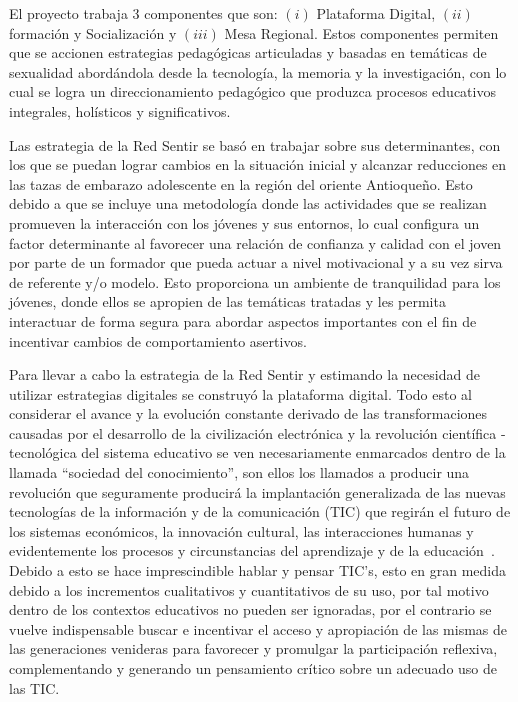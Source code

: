 \documentclass[journal,transmag]{IEEEtran}
\begin{document}
El proyecto trabaja 3 componentes que son: $(i)$ Plataforma Digital, $(ii)$ formación y Socialización y $(iii)$ Mesa Regional. Estos componentes permiten que se accionen estrategias pedagógicas articuladas y basadas en temáticas de sexualidad abordándola desde la tecnología, la memoria y la investigación, con lo cual se logra un direccionamiento pedagógico que produzca procesos educativos integrales, holísticos y significativos. 

Las estrategia de la Red Sentir se basó en trabajar sobre sus determinantes, con los que se puedan lograr cambios en la situación inicial y alcanzar reducciones en las tazas de embarazo adolescente en la región del oriente Antioqueño. Esto debido a que se incluye una metodología donde las actividades que se realizan promueven la interacción con los jóvenes y sus entornos, lo cual configura un factor determinante al favorecer una relación de confianza y calidad con el joven por parte de un formador que pueda actuar a nivel motivacional y a su vez sirva de referente y/o modelo. Esto proporciona un ambiente de tranquilidad para los jóvenes, donde ellos se apropien de las temáticas tratadas y les permita interactuar de forma segura para abordar aspectos importantes con el fin de incentivar cambios de comportamiento asertivos.

Para llevar a cabo la estrategia de la Red Sentir y estimando la necesidad de utilizar estrategias digitales se construyó la plataforma digital. Todo esto al considerar el avance y la evolución constante derivado de las transformaciones causadas por el desarrollo de la civilización electrónica y la revolución científica - tecnológica del sistema educativo se ven necesariamente enmarcados dentro de la llamada ``sociedad del conocimiento'', son ellos los llamados a producir una revolución que seguramente producirá la implantación generalizada de las nuevas tecnologías de la información y de la comunicación (TIC) que regirán el futuro de los sistemas económicos, la innovación cultural, las interacciones humanas y evidentemente los procesos y circunstancias del aprendizaje y de la educación~\cite{Asin2009}. Debido a esto se hace imprescindible hablar y pensar TIC's, esto en gran medida debido a los incrementos cualitativos y cuantitativos de su uso, por tal motivo dentro de los contextos educativos no pueden ser ignoradas, por el contrario se vuelve indispensable buscar e incentivar el acceso y apropiación de las mismas de las generaciones venideras para favorecer y promulgar la participación reflexiva, complementando y generando un pensamiento crítico sobre un adecuado uso de las TIC. 
\end{document}
